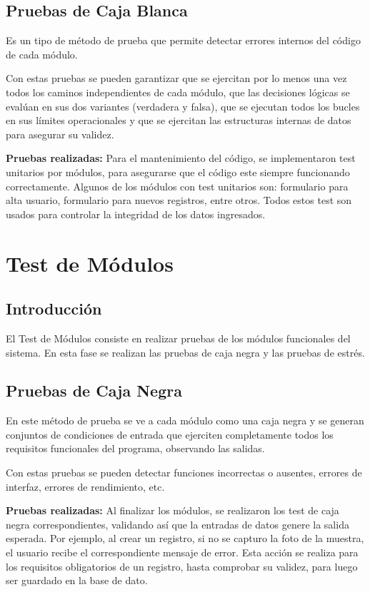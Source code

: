 	\subsection{Pruebas de Caja Blanca}
		Es un tipo de método de prueba que permite detectar errores internos del código de cada módulo. 

		Con estas pruebas se pueden garantizar que se ejercitan por lo menos una vez todos los caminos independientes de cada módulo, que las decisiones lógicas se evalúan en sus dos variantes (verdadera y falsa), que se ejecutan todos los bucles en sus límites operacionales y que se ejercitan las estructuras internas de datos para asegurar su validez.
		\newline

		\textbf{Pruebas realizadas:}
		Para el mantenimiento del código, se implementaron test unitarios por módulos, para asegurarse que el código este siempre funcionando correctamente. Algunos de los módulos con test unitarios son: formulario para alta usuario, formulario para nuevos registros, entre otros.
		Todos estos test son usados para controlar la integridad de los datos ingresados.

\section{Test de Módulos}

	\subsection{Introducción}
		El Test de Módulos consiste en realizar pruebas de los módulos funcionales del sistema. En esta fase se realizan las pruebas de caja negra y las pruebas de estrés. 

	\subsection{Pruebas de Caja Negra}

		En este método de prueba se ve a cada módulo como una caja negra y se generan conjuntos de condiciones de entrada que ejerciten completamente todos los requisitos funcionales del programa, observando las salidas.

		Con estas pruebas se pueden detectar funciones incorrectas o ausentes, errores de interfaz, errores de rendimiento, etc.
		\newline

		\textbf{Pruebas realizadas:}
		Al finalizar los módulos, se realizaron los test de caja negra correspondientes, validando así que la entradas de datos genere la salida esperada.
		Por ejemplo, al crear un registro, si no se capturo la foto de la muestra, el usuario recibe el correspondiente mensaje de error. Esta acción se realiza para los requisitos obligatorios de un registro, hasta comprobar su validez, para luego ser guardado en la base de dato.
			
